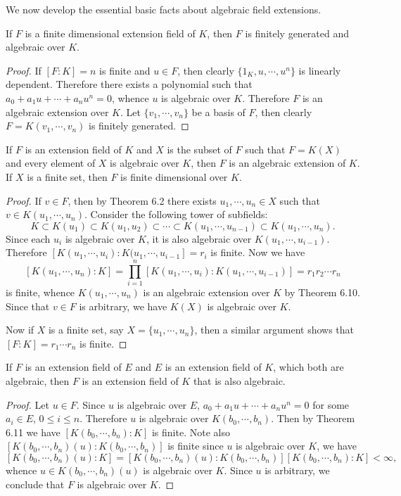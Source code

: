 We now develop the essential basic facts about algebraic field extensions.
\begin{theorem}
If $F$ is a finite dimensional extension field of $K$, then $F$ is finitely generated and algebraic over $K$.
\end{theorem}
\begin{proof}
If $[F:K]=n$ is finite and $u\in F$, then clearly $\{1_K,u,\cdots,u^n\}$ is linearly dependent. Therefore there exists a polynomial such that $a_0+a_1u+\cdots+a_nu^n=0$, whence $u$ is algebraic over $K$. Therefore $F$ is an algebraic extension over $K$. Let $\{v_1,\cdots,v_n\}$ be a basis of $F$, then clearly $F=K(v_1,\cdots,v_n)$ is finitely generated.
\end{proof}
\begin{theorem}
If $F$ is an extension field of $K$ and $X$ is the subset of $F$ such that $F=K(X)$ and every element of $X$ is algebraic over $K$, then $F$ is an algebraic extension of $K$. If $X$ is a finite set, then $F$ is finite dimensional over $K$.
\end{theorem}
\begin{proof}
If $v\in F$, then by Theorem 6.2 there exists $u_1,\cdots,u_n\in X$ such that $v\in K(u_1,\cdots,u_n)$. Consider the following tower of subfields: 
$$
K\subset K\left( u_1 \right) \subset K\left( u_1,u_2 \right) \subset \cdots \subset K\left( u_1,\cdots ,u_{n-1} \right) \subset K\left( u_1,\cdots ,u_n \right) .
$$
Since each $u_i$ is algebraic over $K$, it is also algebraic over $K(u_1,\cdots,u_{i-1})$. Therefore $[K(u_1,\cdots,u_i):K(u_1,\cdots,u_{i-1}]=r_i$ is finite. Now we have 
$$
\left[ K\left( u_1,\cdots ,u_n \right) :K \right] =\prod_{i=1}^n{\left[ K\left( u_1,\cdots ,u_i \right) :K\left( u_1,\cdots ,u_{i-1} \right) \right]}=r_1r_2\cdots r_n
$$
is finite, whence $K(u_1,\cdots,u_n)$ is an algebraic extension over $K$ by Theorem 6.10. Since that $v\in F$ is arbitrary, we have $K(X)$ is algebraic over $K$.\par
Now if $X$ is a finite set, say $X=\{u_1,\cdots,u_n\}$, then a similar argument shows that $[F:K]=r_1\cdots r_n$ is finite.
\end{proof}
\begin{theorem}
If $F$ is an extension field of $E$ and $E$ is an extension field of $K$, which both are algebraic, then $F$ is an extension field of $K$ that is also algebraic.
\end{theorem}
\begin{proof}
Let $u\in F$. Since $u$ is algebraic over $E$, $a_0+a_1u+\cdots+a_nu^n=0$ for some $a_i\in E$, $0\le i\le n$. Therefore $u$ is algebraic over $K(b_0,\cdots,b_n)$. Then by Theorem 6.11 we have $[K(b_0,\cdots,b_n):K]$ is finite. Note also $[K(b_0,\cdots,b_n)(u):K(b_0,\cdots,b_n)]$ is finite since $u$ is algebraic over $K$, we have 
$$
\left[ K\left( b_0,\cdots ,b_n \right) \left( u \right) :K \right] =\left[ K\left( b_0,\cdots ,b_n \right) \left( u \right) :K\left( b_0,\cdots ,b_n \right) \right] \left[ K\left( b_0,\cdots ,b_n \right) :K \right] <\infty ,
$$
whence $u\in K(b_0,\cdots,b_n)(u)$ is algebraic over $K$. Since $u$ is arbitrary, we conclude that $F$ is algebraic over $K$.
\end{proof}
